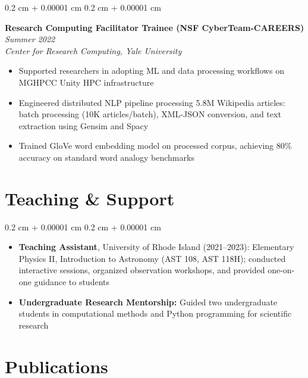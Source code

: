 \documentclass[10pt, letterpaper]{article}
\newenvironment{highlights}{
    \begin{itemize}[
        topsep=0.10 cm,
        parsep=0.10 cm,
        partopsep=0pt,
        itemsep=0pt,
        leftmargin=0.4 cm + 10pt
    ]
}{
    \end{itemize}
}
\newenvironment{highlightsforbulletentries}{
    \begin{itemize}[
        topsep=0.10 cm,
        parsep=0.10 cm,
        partopsep=0pt,
        itemsep=0pt,
        leftmargin=10pt
    ]
}{
    \end{itemize}
}
\newenvironment{onecolentry}{
    \begin{adjustwidth}{
        0.2 cm + 0.00001 cm
    }{
        0.2 cm + 0.00001 cm
    }
}{
    \end{adjustwidth}
}
\begin{document}
\vspace{0.2 cm}

\begin{onecolentry}
  \textbf{Research Computing Facilitator Trainee (NSF CyberTeam-CAREERS)} \hfill\textit{Summer 2022}\\
  \textit{Center for Research Computing, Yale University}

  \begin{highlights}
    \item Supported researchers in adopting ML and data processing workflows on MGHPCC Unity 
    HPC infrastructure
    \item Engineered distributed NLP pipeline processing 5.8M Wikipedia articles: 
        batch processing (10K articles/batch), XML-JSON conversion, and 
        text extraction using Gensim and Spacy
    \item Trained GloVe word embedding model on processed corpus, achieving 
        80\% accuracy on standard word analogy benchmarks
  \end{highlights}
\end{onecolentry}



\section{Teaching \& Support}
\begin{onecolentry}
    \begin{highlightsforbulletentries}
      \item \textbf{Teaching Assistant}, University of Rhode Island (2021--2023): Elementary Physics II, 
      Introduction to Astronomy (AST 108, AST 118H); conducted interactive sessions, organized observation workshops, 
      and provided one-on-one guidance to students
      \item \textbf{Undergraduate Research Mentorship:} Guided two undergraduate students in computational methods 
      and Python programming for scientific research
    \end{highlightsforbulletentries}
\end{onecolentry}


\section{Publications}
\end{document}
